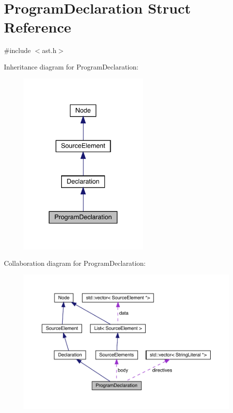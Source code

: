 \hypertarget{struct_program_declaration}{}\section{Program\+Declaration Struct Reference}
\label{struct_program_declaration}


{\ttfamily \#include $<$ast.\+h$>$}



Inheritance diagram for Program\+Declaration\+:\nopagebreak
\begin{figure}[H]
\begin{center}
\leavevmode
\includegraphics[width=185pt]{struct_program_declaration__inherit__graph}
\end{center}
\end{figure}


Collaboration diagram for Program\+Declaration\+:\nopagebreak
\begin{figure}[H]
\begin{center}
\leavevmode
\includegraphics[width=350pt]{struct_program_declaration__coll__graph}
\end{center}
\end{figure}
